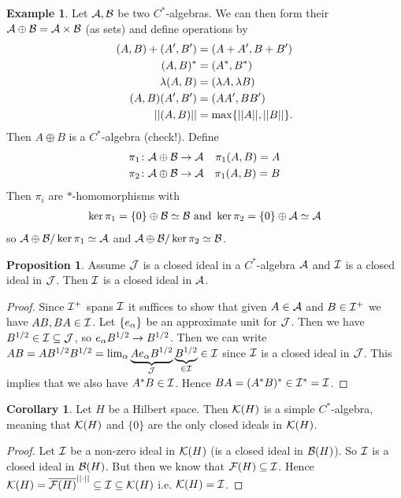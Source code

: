\documentclass[10pt,english,a4paper]{article}
\theoremstyle{definition}
\newtheorem*{corollary}{Corollary}
\newtheorem*{proposition}{Proposition}
\newtheorem*{example}{Example}
\let\emph\relax %
\begin{document}
\begin{example}
Let $\mathcal{A}, \mathcal{B}$ be two $C^*$-algebras. We can then form their
\emph{direct sum} $\mathcal{A} \oplus \mathcal{B} = \mathcal{A} \times \mathcal{B}$ (as sets) and 
define operations by 
\begin{align*}
    (A,B)+(A',B') &= (A+A',B+B') \\
    (A,B)^* &= (A^*, B^*) \\
    \lambda (A,B) &= (\lambda A, \lambda B) \\
    (A,B)(A',B') &= (AA', BB') \\
    ||(A,B)|| &= \max\{||A||, ||B||\}.
\end{align*}    
Then $A\oplus B$ is a $C^*$-algebra (check!).
Define
\begin{align*}
    \pi_1 \colon \mathcal{A}\oplus \mathcal{B} \to \mathcal{A} && \pi_{1} (A,B) = A \\
    \pi_2 \colon \mathcal{A}\oplus \mathcal{B} \to \mathcal{A} && \pi_{1} (A,B) = B \\
\end{align*}
Then $\pi_i$ are $*$-homomorphisms with 
\begin{align*}
    \ker \pi_1 = \{0\} \oplus \mathcal{B} \simeq \mathcal{B} \text{ and }
    \ker \pi_2 = \{0\} \oplus \mathcal{A} \simeq \mathcal{A}    
\end{align*}
so $\mathcal{A} \oplus\mathcal{B} /\ker \pi_1 \simeq \mathcal{A}$ and $\mathcal{A} \oplus\mathcal{B} /\ker \pi_2 \simeq
\mathcal{B}$.

\end{example}

\begin{proposition}
    Assume $\mathcal{J}$ is a closed ideal in a $C^*$-algebra $\mathcal{A}$ and 
$\mathcal{I}$ is a closed ideal in $\mathcal{J}$. Then $\mathcal{I}$ is a closed ideal in $\mathcal{A}$.
\end{proposition}
\begin{proof}
    Since $\mathcal{I}^+$ spans $\mathcal{I}$ it suffices to show that given $A\in \mathcal{A}$ and 
$B \in \mathcal{I}^+$ we have $AB, BA \in \mathcal{I}$. Let 
$\{e_{\alpha}\}$ be an approximate unit for $\mathcal{J}$. Then we have 
$B^{1/2} \in \mathcal{I} \subseteq \mathcal{J}$, so $e_{\alpha}B^{1/2} \to B^{1/2}$.
Then we can write $AB = AB^{1/2}B^{1/2} = 
\lim_{\alpha} \underbrace{Ae_{\alpha}B^{1/2}}_{
\mathcal{J}} \underbrace{B^{1/2}}_{\in \mathcal{I}} \in \mathcal{I} $ since $\mathcal{I}$ is a closed ideal in $\mathcal{J}$.
This implies that we also have $A^*B \in \mathcal{I}$. Hence $BA = (A^*B)^* \in \mathcal{I}^* = \mathcal{I}$.


\end{proof}

\begin{corollary}
    Let $H$ be a Hilbert space. Then $\mathcal{K}(H)$ is a simple $C^*$-algebra, meaning 
that $\mathcal{K}(H)$ and $\{0\}$ are the only closed ideals in $\mathcal{K}(H)$.
\end{corollary}
\begin{proof}
    Let $\mathcal{I}$ be a non-zero ideal in $\mathcal{K}(H)$ (is a closed ideal in $\mathcal{B}(H)$). 
    So $\mathcal{I}$ is a closed ideal in $\mathcal{B}(H)$. But then we know that 
    $\mathcal{F}(H) \subseteq \mathcal{I}$. Hence $\mathcal{K}(H)  = \overline{\mathcal{F}(H)}^{||\cdot||} \subseteq
    \mathcal{I} \subseteq \mathcal{K}(H)$ i.e. $\mathcal{K}(H) = \mathcal{I}$.
\end{proof}
\end{document}
